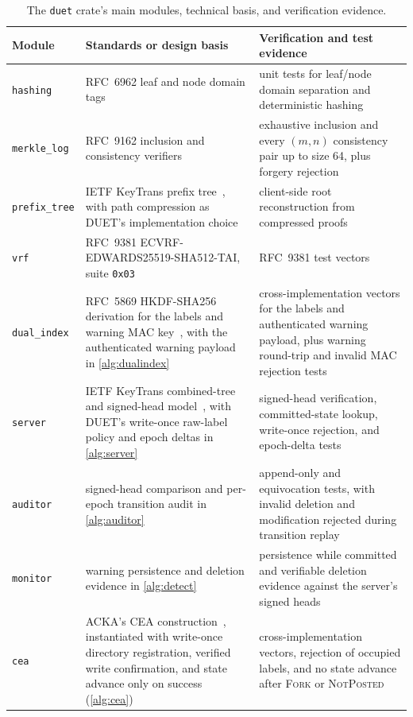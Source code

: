 \begin{table}[ht]
\centering
\caption{The \texttt{duet} crate's main modules, technical basis, and verification evidence.}
\label{tab:impl-modules}
\setlength{\extrarowheight}{2pt}
\footnotesize
\begin{tabular}{@{}>{\raggedright\arraybackslash}p{3.0cm}>{\raggedright\arraybackslash}p{5.0cm}>{\raggedright\arraybackslash}p{4.4cm}@{}}
\toprule
Module & Standards or design basis & Verification and test evidence \\
\midrule
\texttt{hashing} & RFC~6962 leaf and node domain tags~\cite[Section~2.1]{rfc6962} & unit tests for leaf/node domain separation and deterministic hashing \\
\texttt{merkle\_log} & RFC~9162 inclusion and consistency verifiers~\cite[Sections~2.1.3 and~2.1.4]{rfc9162} & exhaustive inclusion and every $(m,n)$ consistency pair up to size 64, plus forgery rejection \\
\texttt{prefix\_tree} & IETF KeyTrans prefix tree~\cite[Section~3.3]{ietf-keytrans-protocol}, with path compression as DUET's implementation choice & client-side root reconstruction from compressed proofs \\
\texttt{vrf} & RFC~9381 ECVRF-EDWARDS25519-SHA512-TAI, suite \texttt{0x03}~\cite[Section~5.5]{rfc9381} & RFC~9381 test vectors~\cite[Appendix~B.3]{rfc9381} \\
\texttt{dual\_index} & RFC~5869 HKDF-SHA256 derivation for the labels and warning MAC key~\cite[Sections~2--3]{rfc5869}, with the authenticated warning payload in \cref{alg:dualindex} & cross-implementation vectors for the labels and authenticated warning payload, plus warning round-trip and invalid MAC rejection tests \\
\texttt{server} & IETF KeyTrans combined-tree and signed-head model~\cite[Sections~3.4 and~11.2]{ietf-keytrans-protocol}, with DUET's write-once raw-label policy and epoch deltas in \cref{alg:server} & signed-head verification, committed-state lookup, write-once rejection, and epoch-delta tests \\
\texttt{auditor} & signed-head comparison and per-epoch transition audit in \cref{alg:auditor} & append-only and equivocation tests, with invalid deletion and modification rejected during transition replay \\
\texttt{monitor} & warning persistence and deletion evidence in \cref{alg:detect} & persistence while committed and verifiable deletion evidence against the server's signed heads \\
\texttt{cea} & ACKA's CEA construction~\cite[Section~5.1]{dowling2023acka}, instantiated with write-once directory registration, verified write confirmation, and state advance only on success (\cref{alg:cea}) & cross-implementation vectors, rejection of occupied labels, and no state advance after \textsc{Fork} or \textsc{NotPosted} \\
\bottomrule
\end{tabular}
\end{table}

